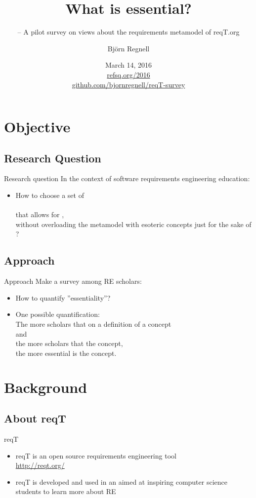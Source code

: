 \documentclass{slides}
\title[What is essential?]{What is essential?}
\subtitle{\footnotesize -- A pilot survey on views about the requirements metamodel of reqT.org}
\author{Björn Regnell}
\institute{Lund University}
\date{March 14, 2016\\ \href{http://refsq.org/2016}{refsq.org/2016}\\ \href{https://github.com/bjornregnell/reqT-survey}{github.com/bjornregnell/reqT-survey}}
\begin{document}
\frame{\titlepage}
\frame{\tableofcontents}

\section{Objective}
\subsection{Research Question}
\begin{Slide}{Research question}
In the context of software requirements engineering education:
\begin{itemize}
\item How to choose a set of \\  \\ that allows for , \\ without overloading the metamodel with esoteric concepts just for the sake of ?
\end{itemize}
\end{Slide}
\subsection{Approach}
\begin{Slide}{Approach}
Make a survey among RE scholars:
\begin{itemize}
\item How to quantify ''essentiality''?
\pause
\item One possible quantification: \\ The more scholars that  on a definition of a concept \\ and \\ the more scholars that  the concept, \\ the more essential is the concept.
\end{itemize}
\end{Slide}

\section{Background}
\subsection{About reqT}
\begin{Slide}{reqT}
\begin{itemize}
\item reqT is an open source requirements engineering tool \\ \url{http://reqt.org/}
\item reqT is developed and used in an  aimed at inspiring  computer science students to learn more about RE
\end{itemize}
\end{Slide}
\end{document}
